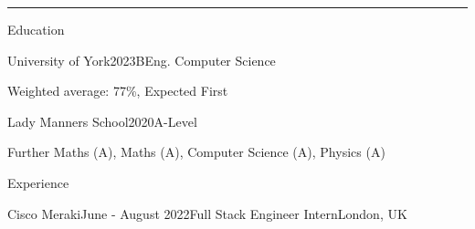 \documentclass{structure} %
\begin{document}
\smallskip
\hrule %
\smallskip

\begin{rSection}{Education}

\begin{rSubsection}{University of York}{2023}{BEng. Computer Science}{}{}
    \item Weighted average: 77\%, Expected First
\end{rSubsection}

\begin{rSubsection}{Lady Manners School}{2020}{A-Level}{}{}
    \item Further Maths (A), Maths (A), Computer Science (A), Physics (A)
\end{rSubsection}
\end{rSection}


\begin{rSection}{Experience}

\begin{rSubsection}{Cisco Meraki}{June - August 2022}{Full Stack Engineer Intern}{London, UK}{}
    \item 
\end{rSubsection}

\end{rSection}


\end{document}

